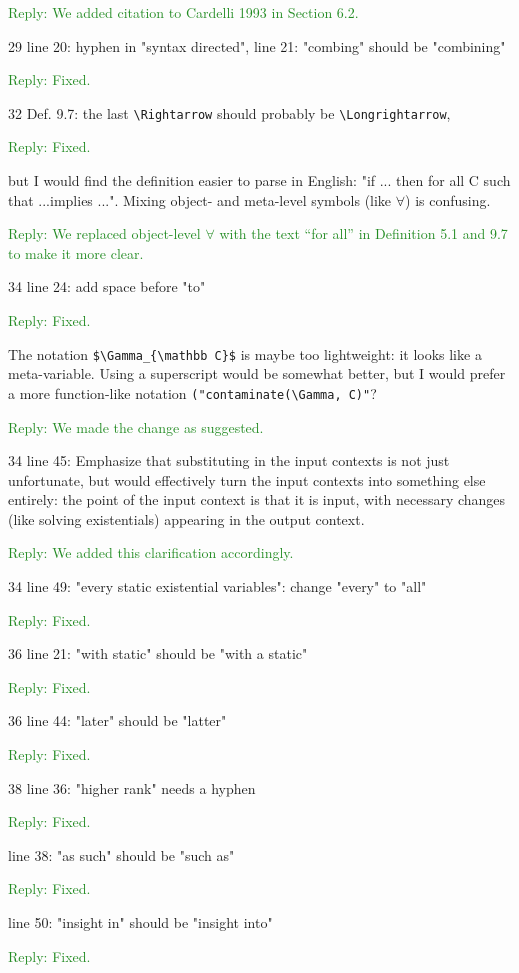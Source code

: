 \documentclass[dvipsnames]{article}
\newcommand\reply[1]{\textcolor{ForestGreen}{Reply: #1}}
\begin{document}
\reply{We added citation to Cardelli 1993 in Section 6.2.}

29 line 20: hyphen in "syntax directed", line 21: "combing" should be
"combining"

\reply{Fixed.}

32 Def. 9.7: the last \verb|\Rightarrow| should probably be \verb|\Longrightarrow|,

\reply{Fixed.}

but I would find the definition easier to parse in English: "if ... then for all
C such that ...implies ...". Mixing object- and meta-level symbols (like $\forall$) is
confusing.

\reply{We replaced object-level $\forall$ with the text ``for all'' in Definition
  5.1 and 9.7 to make it more clear.}

34 line 24: add space before "to"

\reply{Fixed.}

The notation \verb|$\Gamma_{\mathbb C}$| is maybe too lightweight: it looks like
a meta-variable. Using a superscript would be somewhat better, but I would
prefer a more function-like notation \verb|("contaminate(\Gamma, C)"|?

\reply{We made the change as suggested.}

34 line 45: Emphasize that substituting in the input contexts is not just
unfortunate, but would effectively turn the input contexts into something else
entirely: the point of the input context is that it is input, with necessary
changes (like solving existentials) appearing in the output context.

\reply{We added this clarification accordingly.}

34 line 49: "every static existential variables": change "every" to "all"

\reply{Fixed.}

36 line 21: "with static" should be "with a static" 

\reply{Fixed.}

36 line 44: "later" should be "latter" 

\reply{Fixed.}

38 line 36: "higher rank" needs a hyphen 

\reply{Fixed.}

line 38: "as such" should be "such as" 

\reply{Fixed.}

line 50: "insight in" should be "insight into" 

\reply{Fixed.}
\end{document}
